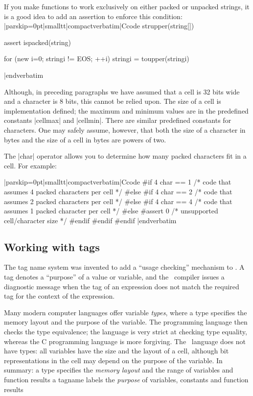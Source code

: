 If you make functions to work exclusively on either packed or unpacked strings,
it is a good idea to add an assertion to enforce this condition:
\listingx\verbatim|parskip=0pt|smalltt|compactverbatim|Ccode
strupper(string[])
    {
    assert ispacked(string)

    for (new i=0; string{i} != EOS; ++i)
        string{i} = toupper(string{i})
    }
|endverbatim\endlistingx

Although, in preceding paragraphs we have assumed that a cell is 32 bits wide
and a character is 8 bits, this cannot be relied upon.
%
The size of a cell is implementation defined; the maximum and minimum values
are in the predefined constants |cellmax| and |cellmin|. There are similar
predefined constants for characters. One may safely assume, however,
that both the size of a character in bytes and the size of a cell in bytes
are powers of two.

The |char| operator allows you to determine how many packed characters fit in
a cell. For example:

\listingx\verbatim|parskip=0pt|smalltt|compactverbatim|Ccode
#if     4 char == 1
        /* code that assumes 4 packed characters per cell */
#else
  #if   4 char == 2
        /* code that assumes 2 packed characters per cell */
  #else
    #if 4 char == 4
        /* code that assumes 1 packed character per cell */
    #else
        #assert 0 /* unsupported cell/character size */
    #endif
  #endif
#endif
|endverbatim\endlistingx

\subsection{Working with tags}
  
\noindent{}%
The tag name system was invented to add a ``usage checking'' mechanism to \Small.
A tag denotes a ``purpose'' of a value or variable, and the \Small\ compiler
issues a diagnostic message when the tag of an expression does not match the
required tag for the context of the expression.

Many modern computer languages offer variable {\it types}, where a type
specifies the memory layout and the purpose of the variable. The programming
language then checks the type equivalence; the  language
is very strict at checking type equality, whereas the C programming language is
more forgiving. The \Small\ language does not have types: all variables have the
size and the layout of a cell, although bit representations in the cell may
depend on the purpose of the variable. In summary:
\beginlist{1em}\compactlist
\list{\lbullet} a type specifies the {\it memory layout\/} and the range of
  variables and function results
\list{\lbullet} a tagname labels the {\it purpose\/} of variables, constants and
  function results
\endlist \goodbreak

